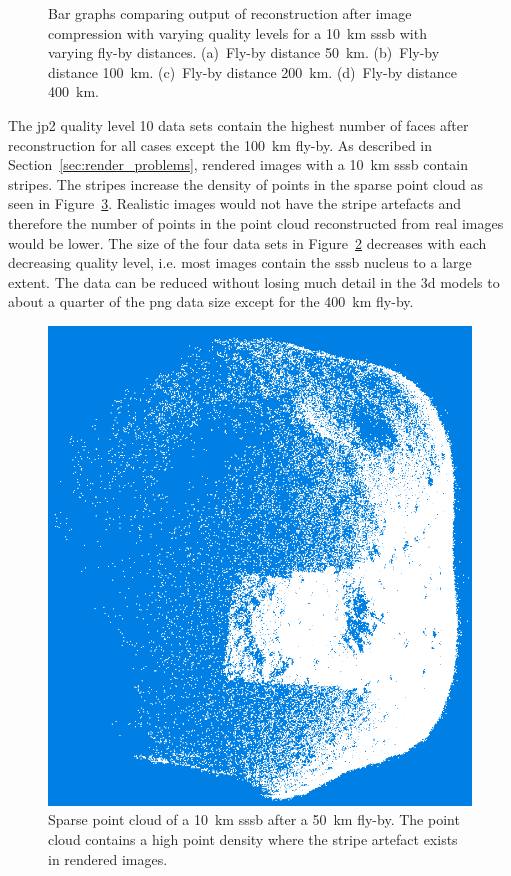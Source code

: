 \begin{figure}[htb]
\begin{subfigure}[b]{0.49\textwidth}
            \caption{}
            \label{fig:recon_120_400_10}
        \end{subfigure}
    \caption{Bar graphs comparing output of reconstruction after image compression with varying quality levels for a \SI{10}{\kilo\meter} \gls{sssb} with varying fly-by distances. (a)~Fly-by distance \SI{50}{\kilo\meter}. (b)~Fly-by distance \SI{100}{\kilo\meter}. (c)~Fly-by distance \SI{200}{\kilo\meter}. (d)~Fly-by distance \SI{400}{\kilo\meter}.}
    \label{fig:recon_stats_10}
\end{figure}

The \gls{jp2} quality level 10 data sets contain the highest number of faces after reconstruction for all cases except the \SI{100}{\kilo\meter} fly-by. As described in Section~\ref{sec:render_problems}, rendered images with a \SI{10}{\kilo\meter} \gls{sssb} contain stripes. The stripes increase the density of points in the sparse point cloud as seen in Figure~\ref{fig:point_cloud_stripe}. Realistic images would not have the stripe artefacts and therefore the number of points in the point cloud reconstructed from real images would be lower. The size of the four data sets in Figure~\ref{fig:recon_stats_10} decreases with each decreasing quality level, i.e. most images contain the \gls{sssb} nucleus to a large extent. The data can be reduced without losing much detail in the \gls{3d} models to about a quarter of the \gls{png} data size except for the \SI{400}{\kilo\meter} fly-by.

\begin{figure}[htb]
    \centering
    \includegraphics[width=.5\textwidth]{doc/thesis/0_figures/models_quality/50_10/120_50_10_point1.png}
    \caption{Sparse point cloud of a \SI{10}{\kilo\meter} \gls{sssb} after a \SI{50}{\kilo\meter} fly-by. The point cloud contains a high point density where the stripe artefact exists in rendered images.}
    \label{fig:point_cloud_stripe}
\end{figure}

